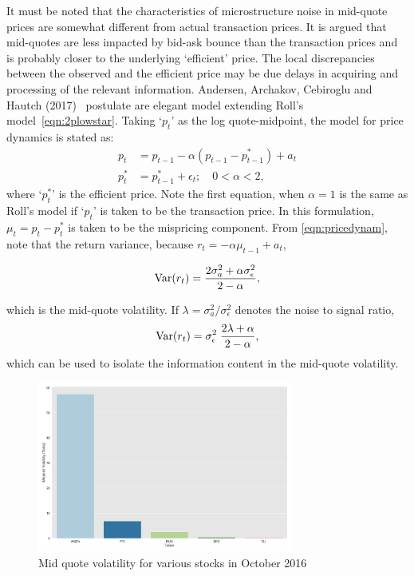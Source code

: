 It must be noted that the characteristics of microstructure noise in mid-quote prices are somewhat different from actual transaction prices. It is argued that mid-quotes are less impacted by bid-ask bounce than the transaction prices and is probably closer to the underlying `efficient' price. The local discrepancies between the observed and the efficient price may be due delays in acquiring and processing of the relevant information. Andersen, Archakov, Cebiroglu and Hautch (2017)~\cite{archcebha17} postulate are elegant model extending Roll's model~\ref{eqn:2plowstar}. Taking `$p_t$' as the log quote-midpoint, the model for price dynamics is stated as:
	\begin{equation}\label{eqn:pricedynam}	
	\begin{split}
	p_t&= p_{t-1} - \alpha (p_{t-1} - p_{t-1}^*) + a_t \\
	p_t^*&= p_{t-1}^* + \epsilon_t; \quad 0<\alpha<2,
	\end{split}
	\end{equation}
where `$p_t^*$' is the efficient price. Note the first equation, when $\alpha=1$ is the same as Roll's model if `$p_t$' is taken to be the transaction price. In this formulation, $\mu_t= p_t - p_t^*$ is taken to be the mispricing component. From \eqref{eqn:pricedynam}, note that the return variance, because $r_t= -\alpha \mu_{t-1} + a_t$,
	
	\begin{equation}
	\operatorname{Var}(r_t)= \dfrac{2\sigma_a^2 + \alpha \sigma_\epsilon^2}{2 - \alpha},
	\end{equation}
	
which is the mid-quote volatility. If $\lambda= \sigma_a^2/\sigma_\epsilon^2$ denotes the noise to signal ratio,
	\begin{equation} \label{eqn:signalrationoise}
	\var(r_t)= \sigma_\epsilon^2\;  \dfrac{2\lambda + \alpha}{2-\alpha},
	\end{equation}
which can be used to isolate the information content in the mid-quote volatility. 


	\begin{figure}[!ht]
	\centering
	\includegraphics[width=0.75\textwidth]{chapters/chapter_trade_data_models/figures/mid_vol.png} 
	\caption{Mid quote volatility for various stocks in October 2016\label{fig:mid_vol}}
	\end{figure}


